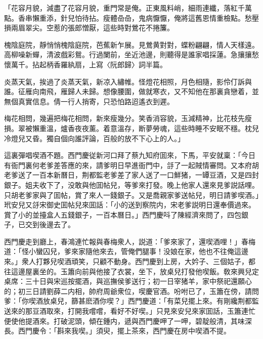「花容月貌，減盡了花容月貌，重門常是俺。正東風料峭，細雨連纖，落紅千萬點。香串懶重添，針兒怕待拈。瘦體喦喦，鬼病懨懨，俺將這舊恩情重檢點。愁壓損兩眉翠尖。空惹的張郎憎厭，這些時對鶯花不捲簾。

槐陰庭院，靜悄悄槐陰庭院，芭蕉新乍展。見鶯黄對對，蝶粉翩翩，情人天樣遠。高柳噪新蟬，清波戲彩鴛。行過闌前，坐近池邊，則聽得是誰家唱採蓮。急攘攘愁懷萬千。拈起柄香羅紈扇，上寫〈阮郎歸〉詞半篇。

炎蒸天氣，挨過了炎蒸天氣，新凉入繡帷。怪燈花相照，月色相隨，影伶仃訴與誰。征雁向南飛，雁歸人未歸。想像腰圍，做就寒衣，又不知他在那裏貪戀着，並無個真實信息。倩一行人捎寄，只恐怕路迢遙衣到遲。

梅花相問，幾遍把梅花相問，新來瘦幾分。笑香消容貌，玉減精神，比花枝先瘦損。翠被懶重溫，爐香夜夜薰。着意溫存，断夢勞魂，這些時睡不安眠不穩。枕兒冷燈兒又昏。獨自個向誰評論，百般的放不下心上的人。」

這裏彈唱喫酒不題。西門慶従新河口拜了蔡九知府囬來，下馬，平安就稟：「今日有衙門裏何老爹差答應的來，請爹明日早進衙門中，㧱了一起賊情審問。又本府胡老爹送了一百本新曆日，荆都監老爹差了家人送了一口鮮猪，一罈豆酒，又是四封銀子。姐夫收下了，没敢與他囬帖兒，等爹來打發。晚上他家人還來見爹説話哩。只胡老爹家與了囬帖，賞了來人一錢銀子。又是喬親家爹送帖兒，明日請爹喫酒。」玳安兒又㧱宋御史囬帖兒來囬話：「小的送到察院内，宋老爹説明日還奉價過來。賞了小的並擡盒人五錢銀子，一百本曆日。」西門慶呌了陳經濟來問了，四包銀子，已交到後邊去了。

西門慶走到廳上，春鴻連忙報與春梅衆人，説道：「爹來家了，還喫酒哩！」春梅道：「怪小蠻囚兒，爹來家隨他來去，管俺們腿事！没娘在家，他也不往俺這邊來。」衆人打夥兒喫酒頑笑，只顧不動身。西門慶到上房，大妗子、三個姑子，都往這邊屋裏坐的。玉簫向前與他接了衣裳，坐下，放桌兒打發他喫飯。敎來興兒定桌席：三十日與宋巡按擺酒，與巡撫侯爹送行；初一日宰猪羊，家中祭祀還願心的；初三日請劉薛二内相，帥府周爺衆位，喫慶官酒。吩咐已了，玉簫在傍，請問爹：「你喫酒放桌兒，篩甚麽酒你喫？」西門慶道：「有菜兒擺上來。有剛纔荆都監送來的那豆酒取來，打開我嚐嚐，看好不好喫。」只見來安兒來家囬話，玉簫連忙便使他提酒來。打破泥頭，傾在鍾内，遞與西門慶呷了一呷，碧靛般清，其味深長。西門慶令：「斟來我喫。」須臾，擺上茶來，西門慶在房中喫酒不提。

